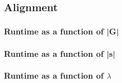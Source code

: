 \documentclass[thesis.tex]{subfiles}
\begin{document}
\subsection{Alignment}
\subsubsection{Runtime as a function of |G|}
\subsubsection{Runtime as a function of |s|}
\subsubsection{Runtime as a function of $\lambda$}
\end{document}
